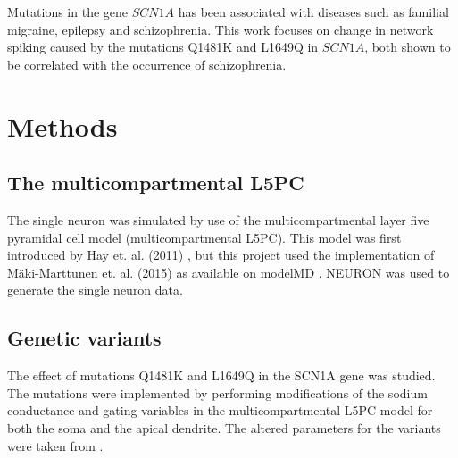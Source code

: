 \documentclass[twocolumn, a4paper,10pt, norsk]{scrartcl}
\begin{document}

Mutations in the gene $SCN1A$ has been associated with diseases such as familial migraine, epilepsy and schizophrenia. This work focuses on change in network spiking caused by the mutations Q1481K and L1649Q in $SCN1A$, both shown to be correlated with the occurrence of schizophrenia. %







\section*{Methods}
\subsection*{The multicompartmental L5PC}
The single neuron was simulated by use of the multicompartmental layer five pyramidal cell model (multicompartmental L5PC). This model was first introduced by Hay et. al. (2011) \cite{l5pc_model}, but this project used the implementation of M\"aki-Marttunen et. al. (2015)\cite{gautes} as available on modelMD \cite{L5PC_Tuomo_modelMD}. NEURON was used to generate the single neuron data.

\subsection*{Genetic variants}
The effect of mutations Q1481K and L1649Q in the SCN1A gene was studied. The mutations were implemented by performing modifications of the sodium conductance and gating variables in the multicompartmental L5PC model for both the soma and the apical dendrite. %
The altered parameters for the variants were taken from \cite{gautes}. %
\end{document}
